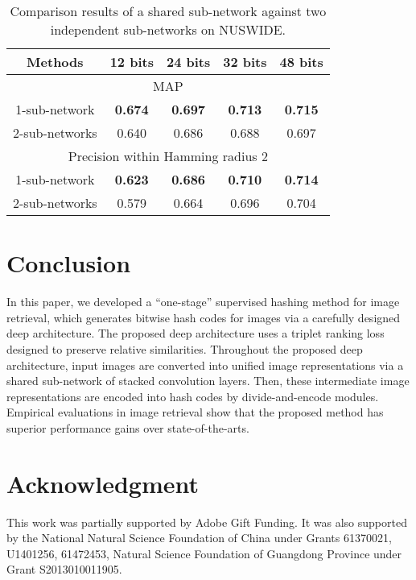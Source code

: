 \documentclass[10pt,twocolumn,letterpaper]{article}
\begin{document}
 \begin{table}[ht!]
\small
    \centering \caption{Comparison results of a shared sub-network against two independent sub-networks on NUSWIDE.}
    \begin{tabular}{|c|c c c c|}
         \hline
Methods & 12 bits & 24 bits & 32 bits & 48 bits  \\
        \hline
        \multicolumn{5}{|c|}{MAP} \\
        \hline
        1-sub-network  & {\bf 0.674 }& {\bf 0.697} & {\bf 0.713} & {\bf 0.715}  \\
        \hline
        2-sub-networks
         & 0.640  & 0.686 & 0.688 & 0.697\\
         \hline
         \multicolumn{5}{|c|}{Precision within Hamming radius 2} \\
        \hline
          1-sub-network& {\bf 0.623 }& {\bf 0.686 } & {\bf 0.710 } & {\bf 0.714 }  \\
        \hline
        2-sub-networks
         &  0.579 & 0.664 & 0.696 & 0.704 \\
         \hline
        \end{tabular}
    \label{sub-network-nus-wide}
\end{table}


\section{Conclusion}
In this paper, we developed a ``one-stage'' supervised hashing method for image retrieval, which generates bitwise hash codes for images via a carefully designed deep architecture. The proposed deep architecture uses a triplet ranking loss designed to preserve
relative similarities. Throughout the proposed deep
architecture, input images are converted into unified image representations via a shared sub-network of stacked
convolution layers. Then, these intermediate image representations are encoded into hash codes by
divide-and-encode modules. Empirical evaluations in image retrieval show that the proposed method has superior performance gains over state-of-the-arts.

\section*{Acknowledgment}
This work was partially supported by Adobe Gift Funding. It was also  supported by the National Natural Science Foundation of China under Grants 61370021, U1401256, 61472453, Natural Science Foundation of Guangdong Province under Grant S2013010011905.



{\small


}
\end{document}
